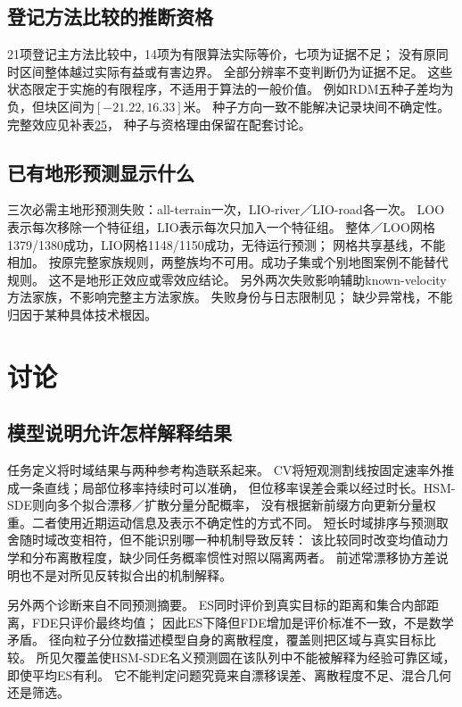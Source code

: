 \subsection{登记方法比较的推断资格}
21项登记主方法比较中，14项为有限算法实际等价，七项为证据不足；
没有原同时区间整体越过实际有益或有害边界。
全部分辨率不变判断仍为证据不足。
这些状态限定于实施的有限程序，不适用于算法的一般价值。
例如RDM五种子差均为负，但块区间为$[-21.22,16.33]$米。
种子方向一致不能解决记录块间不确定性。
完整效应见补表\href{supplement.pdf\#tab:preliminary-method-effects}{25}，
种子与资格理由保留在配套讨论。

\subsection{已有地形预测显示什么}\label{sec:terrain-results}\hypertarget{sec:terrain-results}{}


三次必需主地形预测失败：all-terrain一次，LIO-river／LIO-road各一次。
LOO表示每次移除一个特征组，LIO表示每次只加入一个特征组。
整体／LOO网格1379/1380成功，LIO网格1148/1150成功，无待运行预测；
网格共享基线，不能相加。
按原完整家族规则，两整族均不可用。成功子集或个别地图案例不能替代规则。
这不是地形正效应或零效应结论。
另外两次失败影响辅助known-velocity方法家族，不影响完整主方法家族。
失败身份与日志限制见；
缺少异常栈，不能归因于某种具体技术根因。

\FloatBarrier
\section{讨论}\hypertarget{sec:discussion-score}{}
\subsection{模型说明允许怎样解释结果}
任务定义将时域结果与两种参考构造联系起来。
CV将短观测割线按固定速率外推成一条直线；局部位移率持续时可以准确，
但位移率误差会乘以经过时长。HSM-SDE则向多个拟合漂移／扩散分量分配概率，
没有根据新前缀方向更新分量权重。二者使用近期运动信息及表示不确定性的方式不同。
短长时域排序与预测取舍随时域改变相符，但不能识别哪一种机制导致反转：
该比较同时改变均值动力学和分布离散程度，缺少同任务概率惯性对照以隔离两者。
前述常漂移协方差说明也不是对所见反转拟合出的机制解释。

另外两个诊断来自不同预测摘要。
ES同时评价到真实目标的距离和集合内部距离，FDE只评价最终均值；
因此ES下降但FDE增加是评价标准不一致，不是数学矛盾。
径向粒子分位数描述模型自身的离散程度，覆盖则把区域与真实目标比较。
所见欠覆盖使HSM-SDE名义预测圆在该队列中不能被解释为经验可靠区域，即使平均ES有利。
它不能判定问题究竟来自漂移误差、离散程度不足、混合几何还是筛选。

